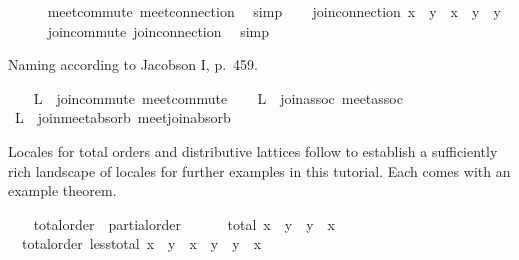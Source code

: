 \begin{isabellebody}
\ \ \ \ \isamarkupfalse%
\ meet{\isacharunderscore}commute\ meet{\isacharunderscore}connection\ \isamarkupfalse%
\ simp\isanewline
\isanewline
\ \ \isamarkupfalse%
\ join{\isacharunderscore}connection{}{\isacharcolon}\ {\isachardoublequoteopen}{\isacharparenleft}x\ {\isasymsqsubseteq}\ y{\isacharparenright}\ {\isacharequal}\ {\isacharparenleft}x\ {\isasymsqunion}\ y\ {\isacharequal}\ y{\isacharparenright}{\isachardoublequoteclose}\isanewline
\ \ \ \ \isamarkupfalse%
\ join{\isacharunderscore}commute\ join{\isacharunderscore}connection\ \isamarkupfalse%
\ simp%
\begin{isamarkuptext}%
Naming according to Jacobson I, p.\ 459.%
\end{isamarkuptext}%
\isamarkuptrue%
\ \ \isamarkupfalse%
\ L{}\ {\isacharequal}\ join{\isacharunderscore}commute\ meet{\isacharunderscore}commute\isanewline
\ \ \isamarkupfalse%
\ L{}\ {\isacharequal}\ join{\isacharunderscore}assoc\ meet{\isacharunderscore}assoc\isanewline
\ \ \isanewline
\ \ \isamarkupfalse%
\ L{}\ {\isacharequal}\ join{\isacharunderscore}meet{\isacharunderscore}absorb\ meet{\isacharunderscore}join{\isacharunderscore}absorb%
\endisataginvisible
{\isafoldinvisible}%
%
\isadeliminvisible
\isanewline
%
\endisadeliminvisible
\isanewline
\ \ \isamarkupfalse%
%
\begin{isamarkuptext}%
Locales for total orders and distributive lattices follow to
  establish a sufficiently rich landscape of locales for
  further examples in this tutorial.  Each comes with an example
  theorem.%
\end{isamarkuptext}%
\isamarkuptrue%
\ \ \isamarkupfalse%
\ total{\isacharunderscore}order\ {\isacharequal}\ partial{\isacharunderscore}order\ {\isacharplus}\isanewline
\ \ \ \ \ total{\isacharcolon}\ {\isachardoublequoteopen}x\ {\isasymsqsubseteq}\ y\ {\isasymor}\ y\ {\isasymsqsubseteq}\ x{\isachardoublequoteclose}\isanewline
\isanewline
\ \ \isamarkupfalse%
\ {\isacharparenleft}\ total{\isacharunderscore}order{\isacharparenright}\ less{\isacharunderscore}total{\isacharcolon}\ {\isachardoublequoteopen}x\ {\isasymsqsubset}\ y\ {\isasymor}\ x\ {\isacharequal}\ y\ {\isasymor}\ y\ {\isasymsqsubset}\ x{\isachardoublequoteclose}\isanewline
%
\isadelimproof
\ \ \ \ %
\endisadelimproof
%
\isatagproof
{}\isamarkupfalse%

\end{isabellebody}
